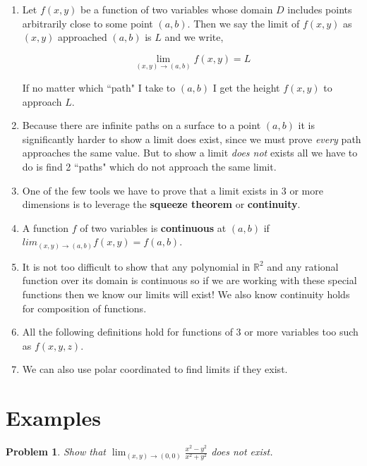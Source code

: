 \documentclass[11pt]{article}
\newtheorem{problem}{Problem}
\begin{document}
\begin{enumerate}
\item Let $f(x,y)$ be a function of two variables whose domain $D$ includes points arbitrarily close to some point $(a,b)$. Then we say the limit of $f(x,y)$ as $(x,y)$ approached $(a,b)$ is $L$ and we write,

\begin{equation*}
    \lim_{(x,y)\to (a,b)}f(x,y) = L
\end{equation*}

If no matter which ``path" I take to $(a,b)$ I get the height $f(x,y)$ to approach $L$.


\item Because there are infinite paths on a surface to a point $(a,b)$ it is significantly harder to show a limit does exist, since we must prove \emph{every} path approaches the same value. But to show a limit \emph{does not} exists all we have to do is find 2 ``paths" which do not approach the same limit.

\item One of the few tools we have to prove that a limit exists in 3 or more dimensions is to leverage the \textbf{squeeze theorem} or \textbf{continuity}.

\item A function $f$ of two variables is \textbf{continuous} at $(a,b)$ if $lim_{(x,y)\to (a,b)} f(x,y) = f(a,b)$.

\item It is not too difficult to show that any polynomial in $\mathbb{R}^2$ and any rational function over its domain is continuous so if we are working with these special functions then we know our limits will exist! We also know continuity holds for composition of functions.

\item All the following definitions hold for functions of 3 or more variables too such as $f(x,y,z)$.

\item We can also use polar coordinated to find limits if they exist.


\end{enumerate}




\section{Examples}

\begin{problem}
    Show that $\lim_{(x,y)\to (0,0)} \frac{x^2-y^2}{x^2+y^2}$ does not exist.
\end{problem}
\end{document}
